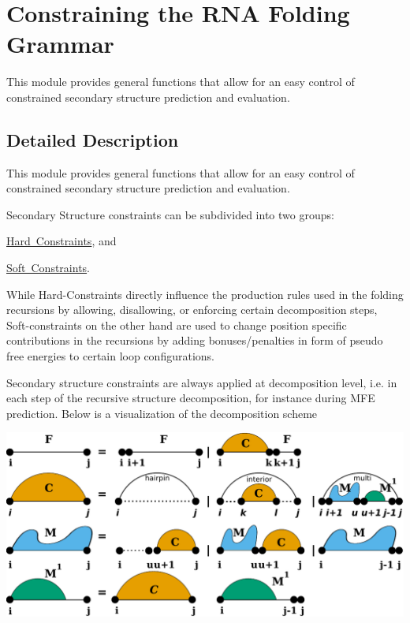 \hypertarget{group__constraints}{}\section{Constraining the R\+NA Folding Grammar}
\label{group__constraints}


This module provides general functions that allow for an easy control of constrained secondary structure prediction and evaluation.  




\subsection{Detailed Description}
This module provides general functions that allow for an easy control of constrained secondary structure prediction and evaluation. 

Secondary Structure constraints can be subdivided into two groups\+:


\begin{DoxyItemize}
\item \mbox{\hyperlink{group__hard__constraints}{Hard Constraints}}, and
\item \mbox{\hyperlink{group__soft__constraints}{Soft Constraints}}.
\end{DoxyItemize}

While Hard-\/\+Constraints directly influence the production rules used in the folding recursions by allowing, disallowing, or enforcing certain decomposition steps, Soft-\/constraints on the other hand are used to change position specific contributions in the recursions by adding bonuses/penalties in form of pseudo free energies to certain loop configurations.

Secondary structure constraints are always applied at decomposition level, i.\+e. in each step of the recursive structure decomposition, for instance during M\+FE prediction. Below is a visualization of the decomposition scheme

 
\begin{DoxyImageNoCaption}
  \mbox{\includegraphics[width=\textwidth,height=\textheight/2,keepaspectratio=true]{recursions}}
\end{DoxyImageNoCaption}


